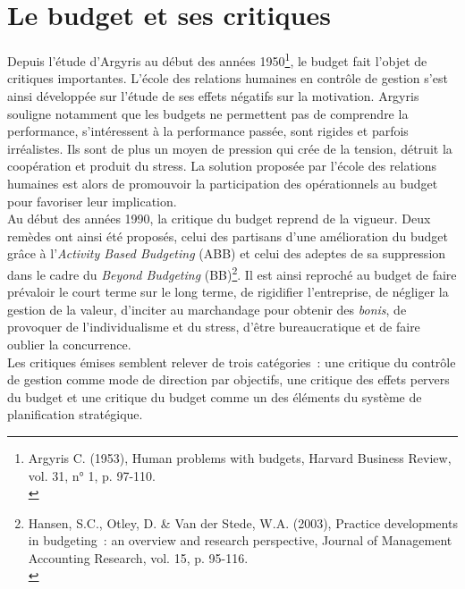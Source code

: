 \documentclass{kaobook}
\begin{document}
\section{Le budget et ses critiques}
\label{sec:orgc9dc0e3}
Depuis l'étude d'Argyris au début des années 1950\footnote{Argyris C. (1953), Human problems with budgets, Harvard Business Review, vol. 31, n° 1, p. 97-110.\\}, le budget fait l'objet de critiques importantes. L'école des relations humaines en contrôle de gestion s'est ainsi développée sur l'étude de ses effets négatifs sur la motivation. Argyris souligne notamment que les budgets ne permettent pas de comprendre la performance, s'intéressent à la performance passée, sont rigides et parfois irréalistes. Ils sont de plus un moyen de pression qui crée de la tension, détruit la coopération et produit du stress. La solution proposée par l'école des relations humaines est alors de promouvoir la participation des opérationnels au budget pour favoriser leur implication.\\

Au début des années 1990, la critique du budget reprend de la vigueur. Deux remèdes ont ainsi été proposés, celui des partisans d'une amélioration du budget grâce à l'\emph{Activity Based Budgeting} (ABB) et celui des adeptes de sa suppression dans le cadre du \emph{Beyond Budgeting} (BB)\footnote{Hansen, S.C., Otley, D. \& Van der Stede, W.A. (2003), Practice developments in budgeting : an overview and research perspective, Journal of Management Accounting Research, vol. 15, p. 95-116.\\}. Il est ainsi reproché au budget de faire prévaloir le court terme sur le long terme, de rigidifier l'entreprise, de négliger la gestion de la valeur, d'inciter au marchandage pour obtenir des \emph{bonis}, de provoquer de l'individualisme et du stress, d'être bureaucratique et de faire oublier la concurrence.\\

Les critiques émises semblent relever de trois catégories : une critique du contrôle de gestion comme mode de direction par objectifs, une critique des effets pervers du budget et une critique du budget comme un des éléments du système de planification stratégique.\\
\end{document}
